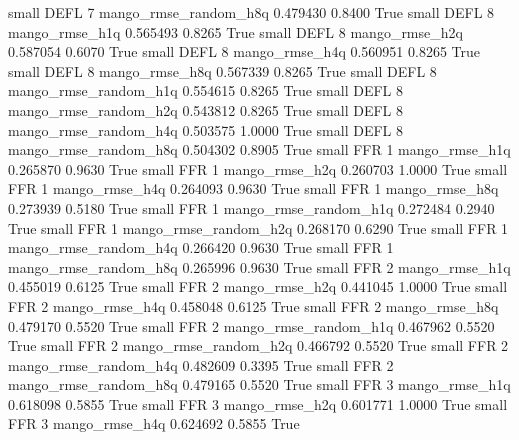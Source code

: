      small     DEFL                 7 mango_rmse_random_h8q      0.479430      0.8400    True
     small     DEFL                 8        mango_rmse_h1q      0.565493      0.8265    True
     small     DEFL                 8        mango_rmse_h2q      0.587054      0.6070    True
     small     DEFL                 8        mango_rmse_h4q      0.560951      0.8265    True
     small     DEFL                 8        mango_rmse_h8q      0.567339      0.8265    True
     small     DEFL                 8 mango_rmse_random_h1q      0.554615      0.8265    True
     small     DEFL                 8 mango_rmse_random_h2q      0.543812      0.8265    True
     small     DEFL                 8 mango_rmse_random_h4q      0.503575      1.0000    True
     small     DEFL                 8 mango_rmse_random_h8q      0.504302      0.8905    True
     small      FFR                 1        mango_rmse_h1q      0.265870      0.9630    True
     small      FFR                 1        mango_rmse_h2q      0.260703      1.0000    True
     small      FFR                 1        mango_rmse_h4q      0.264093      0.9630    True
     small      FFR                 1        mango_rmse_h8q      0.273939      0.5180    True
     small      FFR                 1 mango_rmse_random_h1q      0.272484      0.2940    True
     small      FFR                 1 mango_rmse_random_h2q      0.268170      0.6290    True
     small      FFR                 1 mango_rmse_random_h4q      0.266420      0.9630    True
     small      FFR                 1 mango_rmse_random_h8q      0.265996      0.9630    True
     small      FFR                 2        mango_rmse_h1q      0.455019      0.6125    True
     small      FFR                 2        mango_rmse_h2q      0.441045      1.0000    True
     small      FFR                 2        mango_rmse_h4q      0.458048      0.6125    True
     small      FFR                 2        mango_rmse_h8q      0.479170      0.5520    True
     small      FFR                 2 mango_rmse_random_h1q      0.467962      0.5520    True
     small      FFR                 2 mango_rmse_random_h2q      0.466792      0.5520    True
     small      FFR                 2 mango_rmse_random_h4q      0.482609      0.3395    True
     small      FFR                 2 mango_rmse_random_h8q      0.479165      0.5520    True
     small      FFR                 3        mango_rmse_h1q      0.618098      0.5855    True
     small      FFR                 3        mango_rmse_h2q      0.601771      1.0000    True
     small      FFR                 3        mango_rmse_h4q      0.624692      0.5855    True
